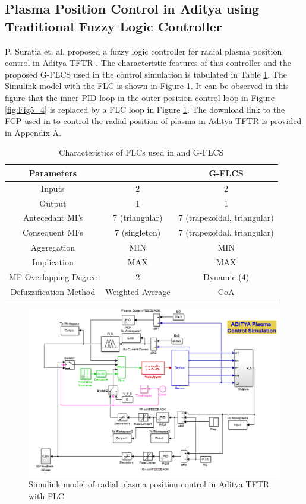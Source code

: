 \subsection{Plasma Position Control in Aditya using Traditional Fuzzy Logic Controller}
P. Suratia et. al. proposed a fuzzy logic controller for radial plasma position control in Aditya TFTR \cite{Suratia2012}. The characteristic features of this controller and the proposed G-FLCS used in the control simulation is tabulated in Table \ref{tab:FLC_Param}. The Simulink model with the FLC is shown in Figure \ref{fig:Fig5_5}. It can be observed in this figure that the inner PID loop in the outer position control loop in Figure \ref{fig:Fig5_4} is replaced by a FLC loop in Figure \ref{fig:Fig5_5}. The download link to the FCP used in \cite{Suratia2012} to control the radial position of plasma in Aditya TFTR is provided in Appendix-A. 
\begin{table}
	\centering
	\caption{Characteristics of FLCs used in \cite{Suratia2012} and G-FLCS}
	\label{tab:FLC_Param}
	\begin{tabular}{ccc}
		\hline Parameters & \cite{Suratia2012} & G-FLCS \\ 
		\hline Inputs & 2 & 2 \\ 
		Output & 1 & 1 \\ 
		Antecedant MFs & 7 (triangular) & 7 (trapezoidal, triangular) \\ 
		Consequent MFs & 7 (singleton) & 7 (trapezoidal, triangular) \\ 
		Aggregation & MIN & MIN \\ 
		Implication & MAX & MAX \\ 
		MF Overlapping Degree & 2 & Dynamic (4) \\ 
		Defuzzification Method & Weighted Average & CoA \\ 
		\hline 
	\end{tabular} 
\end{table}
\begin{figure}[h!]
	\centering
	\includegraphics[width=1\linewidth]{Chapter5/chapter5/Fig4_AdityaSimFLC}
	\caption{Simulink model of radial plasma position control in Aditya TFTR with FLC}
	\label{fig:Fig5_5}
\end{figure}


